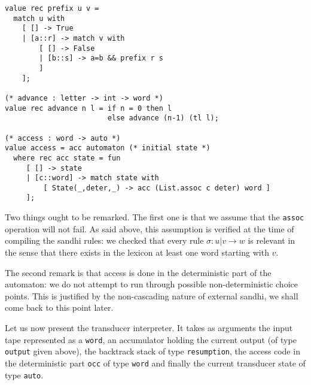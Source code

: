 \begin{verbatim}
value rec prefix u v = 
  match u with
    [ [] -> True
    | [a::r] -> match v with
        [ [] -> False
        | [b::s] -> a=b && prefix r s 
        ]
    ];

(* advance : letter -> int -> word *)
value rec advance n l = if n = 0 then l
                        else advance (n-1) (tl l);

(* access : word -> auto *)
value access = acc automaton (* initial state *)
  where rec acc state = fun
     [ [] -> state
     | [c::word] -> match state with
         [ State(_,deter,_) -> acc (List.assoc c deter) word ]
     ];
\end{verbatim}
Two things ought to be remarked. The first one is that we assume that the
\verb:assoc: operation will not fail. As said above, this assumption is 
verified at the time of compiling the sandhi rules: we checked that every
rule $\sigma:u|v\rightarrow w$ is relevant in the sense that there exists in
the lexicon at least one word starting with $v$. 

The second remark is that access is done in the deterministic part of
the automaton: we do not attempt to run through possible non-deterministic
choice points. This is justified by the non-cascading nature of external
sandhi, we shall come back to this point later. 

Let us now present the transducer interpreter. It takes as arguments
the input tape represented as a \verb:word:, an accumulator holding the 
current output (of type \verb:output: given above), the backtrack stack of 
type \verb:resumption:, the access code in the deterministic part \verb:occ:
of type \verb:word: and finally the current transducer state of type 
\verb:auto:.

